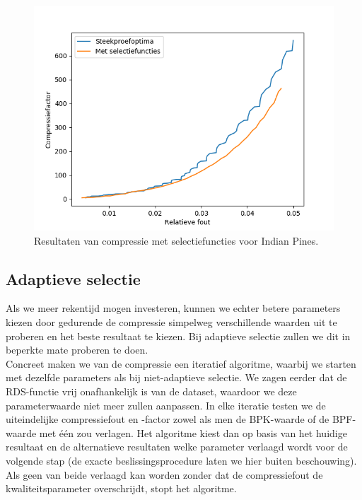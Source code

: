 \begin{figure}[H]
  \centering
  \includegraphics[scale=0.7]{images/parameter_functions_results_Indian_Pines.png}
  \caption{Resultaten van compressie met selectiefuncties voor Indian Pines.}
  \label{fig:parameter_functions_results_Indian_Pines}
\end{figure}

\newpage
\subsection{Adaptieve selectie}

Als we meer rekentijd mogen investeren, kunnen we echter betere parameters kiezen door gedurende de compressie simpelweg verschillende waarden uit te proberen en het beste resultaat te kiezen. Bij adaptieve selectie zullen we dit in beperkte mate proberen te doen.\\

Concreet maken we van de compressie een iteratief algoritme, waarbij we starten met dezelfde parameters als bij niet-adaptieve selectie. We zagen eerder dat de RDS-functie vrij onafhankelijk is van de dataset, waardoor we deze parameterwaarde niet meer zullen aanpassen. In elke iteratie testen we de uiteindelijke compressiefout en -factor zowel als men de BPK-waarde of de BPF-waarde met \'e\'en zou verlagen. Het algoritme kiest dan op basis van het huidige resultaat en de alternatieve resultaten welke parameter verlaagd wordt voor de volgende stap (de exacte beslissingsprocedure laten we hier buiten beschouwing). Als geen van beide verlaagd kan worden zonder dat de compressiefout de kwaliteitsparameter overschrijdt, stopt het algoritme.\\

